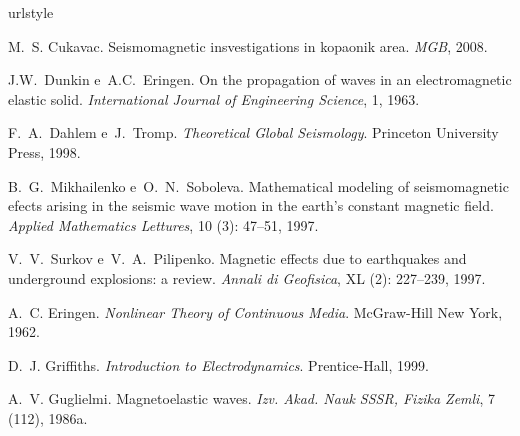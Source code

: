 \documentclass[12pt,a4paper,oneside]{abntex2}
\begin{document}
\listoffigures

\newpage

\tableofcontents

\textual










%

\begin{thebibliography}{25}
\providecommand{\natexlab}[1]{#1}
\providecommand{\url}[1]{\texttt{#1}}
\expandafter\ifx\csname urlstyle\endcsname\relax
  \providecommand{\doi}[1]{doi: #1}\else
  \providecommand{\doi}{doi: \begingroup \urlstyle{rm}\Url}\fi


M.~S. Cukavac.
\newblock Seismomagnetic insvestigations in kopaonik area.
\newblock \emph{MGB}, 2008.

J.W.~Dunkin e~A.C.~Eringen.
\newblock On the propagation of waves in an electromagnetic elastic solid.
\newblock \emph{International Journal of Engineering Science}, 1, 1963.


F.~A.~Dahlem e~J.~Tromp.
\newblock \emph{Theoretical Global Seismology}.
\newblock Princeton University Press, 1998.

B.~G.~Mikhailenko e~O.~N.~Soboleva.
\newblock Mathematical modeling of seismomagnetic efects arising in the seismic
  wave motion in the earth's constant magnetic field.
\newblock \emph{Applied Mathematics Lettures}, 10 (3):
  47--51, 1997.

V.~V.~Surkov e~V.~A.~Pilipenko.
\newblock Magnetic effects due to earthquakes and underground explosions: a
  review.
\newblock \emph{Annali di Geofisica}, XL (2): 227--239, 1997.

A.~C. Eringen.
\newblock \emph{Nonlinear Theory of Continuous Media}.
\newblock McGraw-Hill New York, 1962.

D.~J. Griffiths.
\newblock \emph{Introduction to Electrodynamics}.
\newblock Prentice-Hall, 1999.

A.~V. Guglielmi.
\newblock Magnetoelastic waves.
\newblock \emph{Izv. Akad. Nauk SSSR, Fizika Zemli}, 7 (112), 1986a.


\end{thebibliography}
\end{document}
